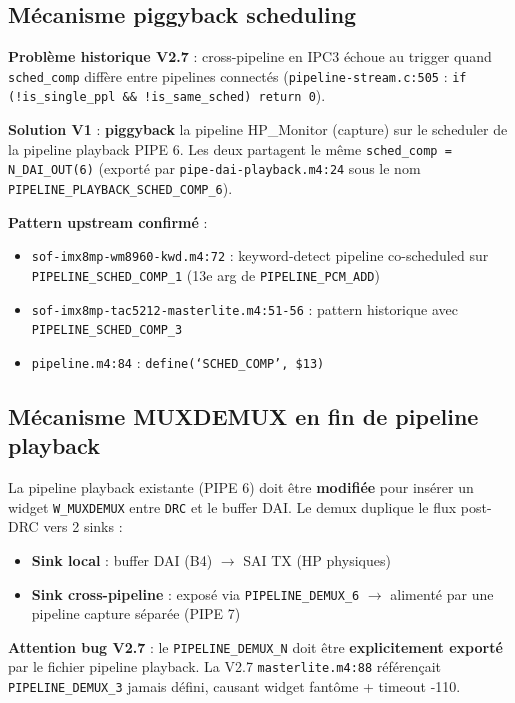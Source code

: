 \documentclass[11pt,a4paper]{article}
\begin{document}
\subsection{Mécanisme piggyback scheduling}

\textbf{Problème historique V2.7} : cross-pipeline en IPC3 échoue au trigger quand \texttt{sched\_comp} diffère entre pipelines connectés (\texttt{pipeline-stream.c:505} : \texttt{if (!is\_single\_ppl \&\& !is\_same\_sched) return 0}).

\textbf{Solution V1} : \textbf{piggyback} la pipeline HP\_Monitor (capture) sur le scheduler de la pipeline playback PIPE 6. Les deux partagent le même \texttt{sched\_comp = N\_DAI\_OUT(6)} (exporté par \texttt{pipe-dai-playback.m4:24} sous le nom \texttt{PIPELINE\_PLAYBACK\_SCHED\_COMP\_6}).

\textbf{Pattern upstream confirmé} :
\begin{itemize}[leftmargin=*, itemsep=1pt]
  \item \texttt{sof-imx8mp-wm8960-kwd.m4:72} : keyword-detect pipeline co-scheduled sur \texttt{PIPELINE\_SCHED\_COMP\_1} (13e arg de \texttt{PIPELINE\_PCM\_ADD})
  \item \texttt{sof-imx8mp-tac5212-masterlite.m4:51-56} : pattern historique avec \texttt{PIPELINE\_SCHED\_COMP\_3}
  \item \texttt{pipeline.m4:84} : \texttt{define(`SCHED\_COMP', \$13)}
\end{itemize}

\subsection{Mécanisme MUXDEMUX en fin de pipeline playback}

La pipeline playback existante (PIPE 6) doit être \textbf{modifiée} pour insérer un widget \texttt{W\_MUXDEMUX} entre \texttt{DRC} et le buffer DAI. Le demux duplique le flux post-DRC vers 2 sinks :
\begin{itemize}[leftmargin=*, itemsep=1pt]
  \item \textbf{Sink local} : buffer DAI (B4) $\to$ SAI TX (HP physiques)
  \item \textbf{Sink cross-pipeline} : exposé via \texttt{PIPELINE\_DEMUX\_6} $\to$ alimenté par une pipeline capture séparée (PIPE 7)
\end{itemize}

\textbf{Attention bug V2.7} : le \texttt{PIPELINE\_DEMUX\_N} doit être \textbf{explicitement exporté} par le fichier pipeline playback. La V2.7 \texttt{masterlite.m4:88} référençait \texttt{PIPELINE\_DEMUX\_3} jamais défini, causant widget fantôme + timeout -110.
\end{document}
